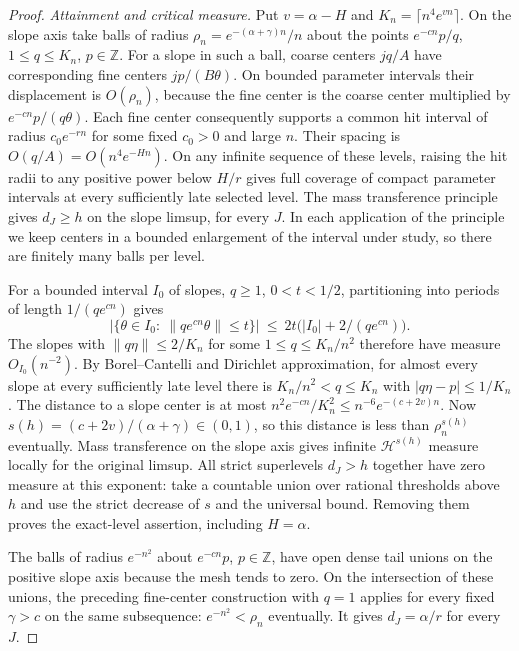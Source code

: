 \documentclass[11pt,reqno,a4paper]{amsart}
\theoremstyle{remark}
\numberwithin{equation}{section}
\begin{document}
\begin{proof}
\emph{Attainment and critical measure.}
Put \(v=\alpha-H\) and \(K_n=\lceil n^4 e^{vn}\rceil\).
On the slope axis take balls of radius
\(\rho_n=e^{-(\alpha+\gamma)n}/n\) about the points \(e^{-cn}p/q\),
\(1\le q\le K_n\), \(p\in\mathbb Z\). For a slope in such a ball,
coarse centers \(jq/A\) have corresponding fine centers \(jp/(B\theta)\).
On bounded parameter intervals their displacement is \(O(\rho_n)\),
because the fine center is the coarse center multiplied by
\(e^{-cn}p/(q\theta)\). Each fine center consequently supports a
common hit interval of radius \(c_0e^{-rn}\) for some fixed \(c_0>0\)
and large \(n\). Their spacing is \(O(q/A)=O(n^4 e^{-Hn})\).
On any infinite sequence of these levels, raising the hit radii to
any positive power below \(H/r\) gives full coverage of compact
parameter intervals at every sufficiently late selected level. The
mass transference principle \cite[Theorem~2]{BV} gives \(d_J\ge h\)
on the slope limsup, for every \(J\). In each application of the
principle we keep centers in a bounded enlargement of the interval
under study, so there are finitely many balls per level.

For a bounded interval \(I_0\) of slopes, \(q\ge1\), \(0<t<1/2\),
partitioning into periods of length \(1/(qe^{cn})\) gives
\begin{equation}\label{eq:theta-period}
 \big|\{\theta\in I_0:\ \|qe^{cn}\theta\|\le t\}\big|
 \ \le\ 2t\big(|I_0|+2/(qe^{cn})\big).
\end{equation}
The slopes with \(\|q\eta\|\le2/K_n\) for some \(1\le q\le K_n/n^2\)
therefore have measure \(O_{I_0}(n^{-2})\). By Borel--Cantelli and
Dirichlet approximation, for almost every slope at every sufficiently
late level there is \(K_n/n^2<q\le K_n\) with \(|q\eta-p|\le1/K_n\).
The distance to a slope center is at most
\(n^2 e^{-cn}/K_n^2\le n^{-6}e^{-(c+2v)n}\).
Now \(s(h)=(c+2v)/(\alpha+\gamma)\in(0,1)\), so this distance is
less than \(\rho_n^{s(h)}\) eventually. Mass transference on the
slope axis gives infinite \(\mathcal H^{s(h)}\) measure locally for
the original limsup. All strict superlevels \(d_J>h\) together have
zero measure at this exponent: take a countable union over rational
thresholds above \(h\) and use the strict decrease of \(s\) and the
universal bound. Removing them proves the exact-level assertion,
including \(H=\alpha\).

The balls of radius \(e^{-n^2}\) about \(e^{-cn}p\), \(p\in\mathbb Z\),
have open dense tail unions on the positive slope axis because the
mesh tends to zero. On the intersection of these unions, the
preceding fine-center construction with \(q=1\) applies for every
fixed \(\gamma>c\) on the same subsequence: \(e^{-n^2}<\rho_n\)
eventually. It gives \(d_J=\alpha/r\) for every \(J\).


\end{proof}
\end{document}
